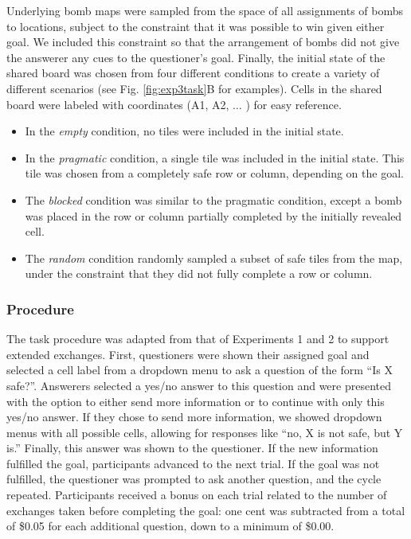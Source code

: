 \documentclass[12pt, floatsintext, jou]{apa6}
\begin{document}
Underlying bomb maps were sampled from the space of all assignments of bombs to locations,  subject to the constraint that it was possible to win given either goal. 
We included this constraint so that the arrangement of bombs did not give the answerer any cues to the questioner's goal.
Finally, the initial state of the shared board was chosen from four different conditions to create a variety of different scenarios (see Fig. \ref{fig:exp3task}B for examples).
Cells in the shared board were labeled with coordinates (A1, A2, $\dots$ ) for easy reference.
\begin{itemize}
\item In the \emph{empty} condition, no tiles were included in the initial state.
\item In the \emph{pragmatic} condition, a single tile was included in the initial state. This tile was chosen from a completely safe row or column, depending on the goal.%
\item The \emph{blocked} condition was similar to the pragmatic condition, except a bomb was placed in the row or column partially completed by the initially revealed cell. %
\item The \emph{random} condition randomly sampled a subset of safe tiles from the map, under the constraint that they did not fully complete a row or column. 
\end{itemize}

\subsubsection{Procedure}

The task procedure was adapted from that of Experiments 1 and 2 to support extended exchanges. 
First, questioners were shown their assigned goal and selected a cell label from a dropdown menu to ask a question of the form ``Is X safe?''. 
Answerers selected a yes/no answer to this question and were presented with the option to either send more information or to continue with only this yes/no answer.
If they chose to send more information, we showed dropdown menus with all possible cells, allowing for responses like ``no, X is not safe, but Y is.''
Finally, this answer was shown to the questioner.
If the new information fulfilled the goal, participants advanced to the next trial.
If the goal was not fulfilled, the questioner was prompted to ask another question, and the cycle repeated.
Participants received a bonus on each trial related to the number of exchanges taken before completing the goal: one cent was subtracted from a total of \$0.05 for each additional question, down to a minimum of \$0.00.
\end{document}
